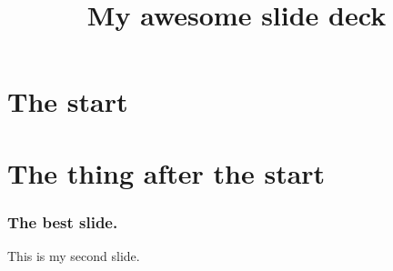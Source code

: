 \documentclass{beamer}
\title{My awesome slide deck}
\begin{document}
\frame{\titlepage}


\section{The start}

\section{The thing after the start}
\begin{frame}
    \frametitle{The best slide.}
    This is my second slide.
\end{frame}
\end{document}
